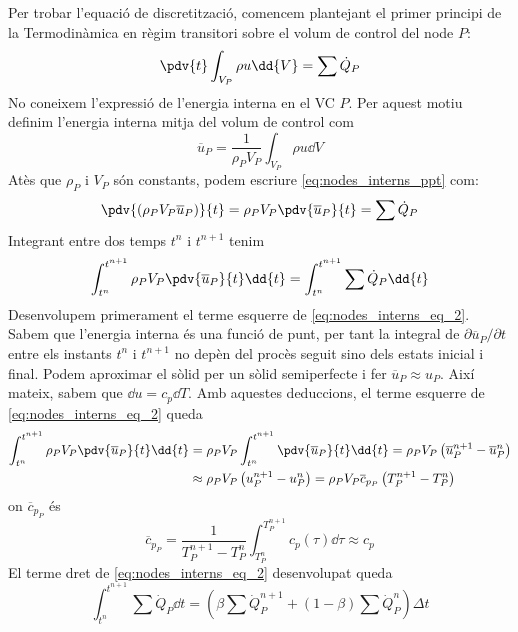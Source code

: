Per trobar l'equació de discretització, comencem plantejant el primer principi de la Termodinàmica en règim transitori sobre el volum de control del node $P$:
\begin{equation} \label{eq:nodes_interns_ppt}
	\pdv{t} \int_{V_P} \rho u \dd{V} = \sum \dot{Q}_P
\end{equation}
No coneixem l'expressió de l'energia interna en el VC $P$. Per aquest motiu definim l'energia interna mitja del volum de control com
\begin{equation}
	\overline{u}_P = \frac{1}{\rho_P V_P} \int_{V_P} \rho u \dd{V}
\end{equation}
Atès que $\rho_P$ i $V_P$ són constants, podem escriure \eqref{eq:nodes_interns_ppt} com:
\begin{equation} 
	\pdv{\left(\rho_P V_P \overline{u}_P\right)}{t} = 
	\rho_P V_P \pdv{\overline{u}_P}{t} =
	\sum \dot{Q}_P
\end{equation}
Integrant entre dos temps $t^n$ i $t^{n+1}$ tenim
\begin{equation} \label{eq:nodes_interns_eq_2}
	\int_{t^n}^{t^{n+1}} \rho_P V_P \pdv{\overline{u}_P}{t} \dd{t} = 
	\int_{t^n}^{t^{n+1}} \sum \dot{Q}_P \dd{t}
\end{equation}
Desenvolupem primerament el terme esquerre de \eqref{eq:nodes_interns_eq_2}. Sabem que l'energia interna és una funció de punt, per tant la integral de $\partial \overline{u}_P / \partial t$ entre els instants $t^n$ i $t^{n+1}$ no depèn del procès seguit sino dels estats inicial i final. Podem aproximar el sòlid per un sòlid semiperfecte i fer $\overline{u}_P \approx u_P$. Així mateix, sabem que $\dd{u} = c_p \dd{T}$. Amb aquestes deduccions, el terme esquerre de \eqref{eq:nodes_interns_eq_2} queda
\begin{align}
	\int_{t^n}^{t^{n+1}} \rho_P V_P \pdv{\overline{u}_P}{t} \dd{t} 			&= 
	\rho_P V_P  \int_{t^n}^{t^{n+1}} \pdv{\overline{u}_P}{t} \dd{t} = 
	\rho_P V_P \left( \overline{u}_P^{n+1} - \overline{u}_P^n \right) \nonumber  \\ 	&\approx 
	\rho_P V_P \left( u_P^{n+1} - u_P^n \right) = 
	\rho_P V_P \overline{c}_{p_P} \left( T_P^{n+1} - T_P^n \right) \label{eq:nodes_interns_terme_esquerre}
\end{align}
on $\overline{c}_{p_P}$ és
\[
	\overline{c}_{p_P} = \frac{1}{T_P^{n+1} - T_P^n} \int_{T_P^n}^{T_P^{n+1}} c_p(\tau) \dd{\tau} \approx c_p
\]
El terme dret de \eqref{eq:nodes_interns_eq_2} desenvolupat queda
\begin{equation} \label{eq:nodes_interns_terme_dret}
	\int_{t^n}^{t^{n+1}} \sum \dot{Q}_P \dd{t} = 
	\left( \beta \sum \dot{Q}_P^{n+1} + (1 - \beta) \sum \dot{Q}_P^n \right) \Delta t
\end{equation}
